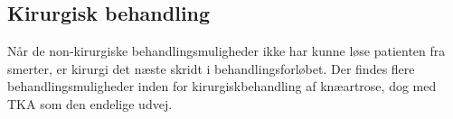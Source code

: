 
%

\subsection{Kirurgisk behandling}

Når de non-kirurgiske behandlingsmuligheder ikke har kunne løse patienten fra smerter, er kirurgi det næste skridt i behandlingsforløbet. Der findes flere behandlingsmuligheder inden for kirurgiskbehandling af knæartrose, dog med TKA som den endelige udvej. %

